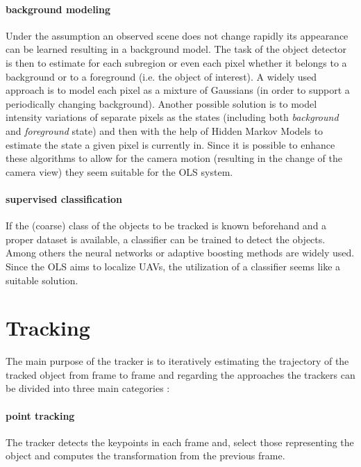 \paragraph{background modeling} Under the assumption an observed scene does not change rapidly its appearance can be learned resulting in a background model. The task of the object detector is then to estimate for each subregion or even each pixel whether it belongs to a background or to a foreground (i.e. the object of interest). A widely used approach is to model each pixel as a mixture of Gaussians (in order to support a periodically changing background). Another possible solution is to model intensity variations of separate pixels as the states (including both \textit{background} and \textit{foreground} state) and then with the help of Hidden Markov Models to estimate the state a given pixel is currently in. Since it is possible to enhance these algorithms to allow for the camera motion (resulting in the change of the camera view) they seem suitable for the OLS system. 

\paragraph{supervised classification} If the (coarse) class of the objects to be tracked is known beforehand and a proper dataset is available, a classifier can be trained to detect the objects. Among others the neural networks or adaptive boosting methods are widely used. Since the OLS aims to localize UAVs, the utilization of a classifier seems like a suitable solution.

\section{Tracking}

The main purpose of the tracker is to iteratively estimating the trajectory of the tracked object from frame to frame and regarding the approaches the trackers can be divided into three main categories \cite{Yilmaz:2006:OTS:1177352.1177355}:

\paragraph{point tracking} 
The tracker detects the keypoints in each frame and, select those representing the object and computes the transformation from the previous frame.

